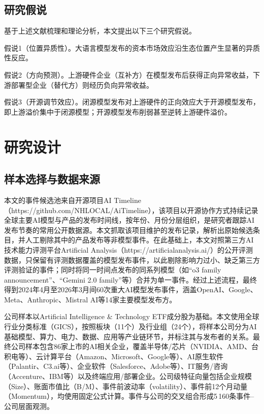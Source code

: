 \documentclass[11pt,fontset=fandol,a4paper]{ctexart}
\newcommand{\changed}[1]{{\color{orange!85!black}#1}}
\begin{document}
\subsection{研究假说}

基于上述文献梳理和理论分析，本文提出以下三个研究假说。

假说1（位置异质性）。大语言模型发布的资本市场效应沿生态位置产生显著的异质性反应。

假说2（方向预测）。上游硬件企业（互补方）在模型发布后获得正向异常收益，下游部署型企业（替代方）则经历负向异常收益。

假说3（开源调节效应）。闭源模型发布对上游硬件的正向效应大于开源模型发布，即上游溢价集中于闭源模型；开源模型发布削弱甚至逆转上游硬件溢价。


\section{研究设计}

\subsection{样本选择与数据来源}

\changed{本文的事件候选池来自开源项目AI Timeline（https://github.com/NHLOCAL/AiTimeline），该项目以开源协作方式持续记录全球主要AI模型与产品的发布时间线，按年份、月份分层组织，是研究者跟踪AI发布节奏的常用公开数据源。本文抓取该项目维护的发布记录，解析出原始候选条目，并人工剔除其中的产品发布等非模型事件。在此基础上，本文对照第三方AI技术能力评测平台Artificial Analysis（https://artificialanalysis.ai/）的公开评测数据，只保留有评测数据覆盖的模型发布事件，以此剔除影响力过小、缺乏第三方评测验证的事件；同时将同一时间点发布的同系列模型（如“o3 family announcement”、“Gemini 2.0 family”等）合并为单一事件。经过上述流程，最终得到2024年4月至2026年3月间60次重大AI模型发布事件，涵盖OpenAI、Google、Meta、Anthropic、Mistral AI等14家主要模型发布方。}

公司样本以Artificial Intelligence \& Technology ETF成分股为基础。本文使用全球行业分类标准（GICS），按照板块（11个）及行业组（24个），将样本公司分为AI基础模型、算力、电力、数据、应用等产业链环节，并标注其与发布者的关系。最终公司样本包含86家上市的AI相关企业，覆盖半导体/芯片（NVIDIA、AMD、台积电等）、云计算平台（Amazon、Microsoft、Google等）、AI原生软件（Palantir、C3.ai等）、企业软件（Salesforce、Adobe等）、IT服务/咨询（Accenture、IBM等）以及终端应用/部署企业。公司级特征向量包括企业规模（Size）、账面市值比（B/M）、事件前波动率（volatility）、事件前12个月动量（Momentum），均使用固定公式计算。事件与公司的交叉组合形成5\,160条事件--公司层面观测。
\end{document}
